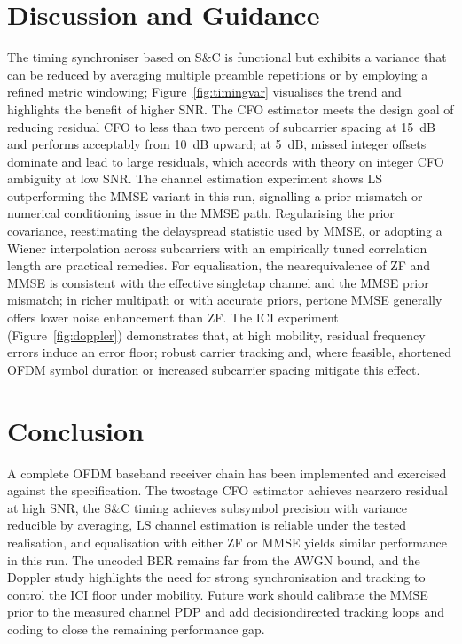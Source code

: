 \documentclass[journal,onecolumn]{IEEEtran}
\begin{document}
\section{Discussion and Guidance}
The timing synchroniser based on S\&C is functional but exhibits a variance that can be reduced by averaging multiple preamble repetitions or by employing a refined metric windowing; Figure~\ref{fig:timingvar} visualises the trend and highlights the benefit of higher SNR. The CFO estimator meets the design goal of reducing residual CFO to less than two percent of subcarrier spacing at \SI{15}{dB} and performs acceptably from \SI{10}{dB} upward; at \SI{5}{dB}, missed integer offsets dominate and lead to large residuals, which accords with theory on integer CFO ambiguity at low SNR. The channel estimation experiment shows LS outperforming the MMSE variant in this run, signalling a prior mismatch or numerical conditioning issue in the MMSE path. Regularising the prior covariance, re\textendash estimating the delay\textendash spread statistic used by MMSE, or adopting a Wiener interpolation across subcarriers with an empirically tuned correlation length are practical remedies. For equalisation, the near\textendash equivalence of ZF and MMSE is consistent with the effective single\textendash tap channel and the MMSE prior mismatch; in richer multipath or with accurate priors, per\textendash tone MMSE generally offers lower noise enhancement than ZF. The ICI experiment (Figure~\ref{fig:doppler}) demonstrates that, at high mobility, residual frequency errors induce an error floor; robust carrier tracking and, where feasible, shortened OFDM symbol duration or increased subcarrier spacing mitigate this effect.

\section{Conclusion}
A complete OFDM baseband receiver chain has been implemented and exercised against the specification. The two\textendash stage CFO estimator achieves near\textendash zero residual at high SNR, the S\&C timing achieves sub\textendash symbol precision with variance reducible by averaging, LS channel estimation is reliable under the tested realisation, and equalisation with either ZF or MMSE yields similar performance in this run. The uncoded BER remains far from the AWGN bound, and the Doppler study highlights the need for strong synchronisation and tracking to control the ICI floor under mobility. Future work should calibrate the MMSE prior to the measured channel PDP and add decision\textendash directed tracking loops and coding to close the remaining performance gap.
\end{document}
